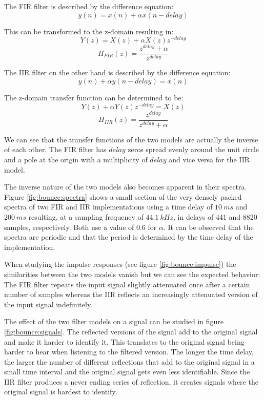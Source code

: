 \documentclass[journal]{IEEEtran}
\begin{document}
The FIR filter is described by the difference equation:
\begin{equation}
    y(n) = x(n) + \alpha x(n-delay)
\end{equation}

This can be transformed to the z-domain resulting in:
 \begin{equation}
     Y(z) = X(z) + \alpha X(z) z^{-delay}
 \end{equation}
 \begin{equation}
     H_{FIR}(z) = \frac{z^{delay} + \alpha}{z^{delay}}
\end{equation}

The IIR filter on the other hand is described by the difference equation:
\begin{equation}
    y(n) + \alpha y(n-delay) = x(n)
\end{equation}

The z-domain transfer function can be determined to be:
\begin{equation}
    Y(z) + \alpha Y(z) z^{-delay} = X(z)
\end{equation}
\begin{equation}
    H_{IIR}(z) = \frac{z^{delay}}{z^{delay} + \alpha}
\end{equation}

We can see that the transfer functions of the two models are actually the inverse of each other. The FIR filter has $delay$ zeros spread evenly around the unit circle and a pole at the origin with a multiplicity of $delay$ and vice versa for the IIR model.

The inverse nature of the two models also becomes apparent in their spectra. Figure \ref{fig:bounce:spectra} shows a small section of the very densely packed spectra of two FIR and IIR implementations using a time delay of $\SI{10}{ms}$ and $\SI{200}{ms}$ resulting,  at a sampling frequency of $\SI{44.1}{kHz}$, in delays of 441 and 8820 samples, respectively. Both use a value of 0.6 for $\alpha$. It can be observed that the spectra are periodic and that the period is determined by the time delay of the implementation.

When studying the impulse responses (see figure \ref{fig:bounce:impulse}) the similarities between the two models vanish but we can see the expected behavior: The FIR filter repeats the input signal slightly attenuated once after a certain number of samples whereas the IIR reflects an increasingly attenuated version of the input signal indefinitely.

The effect of the two filter models on a signal can be studied in figure \ref{fig:bounce:signals}. The reflected versions of the signal add to the original signal and make it harder to identify it. This translates to the original signal being harder to hear when listening to the filtered version. The longer the time delay, the larger the number of different reflections that add to the original signal in a small time interval and the original signal gets even less identifiable. Since the IIR filter produces a never ending series of reflection, it creates signals where the original signal is hardest to identify.
\end{document}
